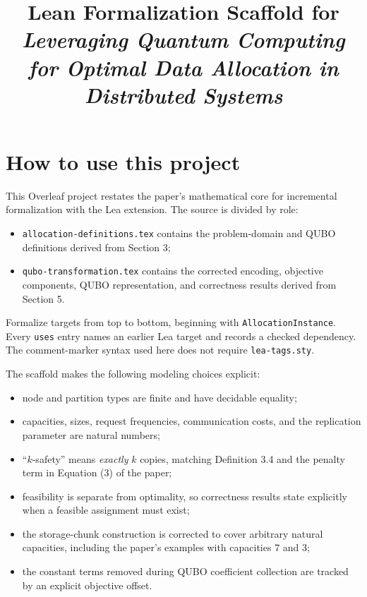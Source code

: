\documentclass[11pt]{article}
\title{Lean Formalization Scaffold for\\
  \emph{Leveraging Quantum Computing for Optimal Data Allocation in
  Distributed Systems}}
\author{}
\date{}
\begin{document}
\maketitle

\section*{How to use this project}

This Overleaf project restates the paper's mathematical core for incremental
formalization with the Lea extension. The source is divided by role:

\begin{itemize}
  \item \texttt{allocation-definitions.tex} contains the problem-domain and
    QUBO definitions derived from Section 3;
  \item \texttt{qubo-transformation.tex} contains the corrected encoding,
    objective components, QUBO representation, and correctness results derived
    from Section 5.
\end{itemize}

Formalize targets from top to bottom, beginning with
\texttt{AllocationInstance}. Every \texttt{uses} entry names an earlier Lea
target and records a checked dependency. The comment-marker syntax used here
does not require \texttt{lea-tags.sty}.

The scaffold makes the following modeling choices explicit:

\begin{itemize}
  \item node and partition types are finite and have decidable equality;
  \item capacities, sizes, request frequencies, communication costs, and the
    replication parameter are natural numbers;
  \item ``$k$-safety'' means \emph{exactly} $k$ copies, matching Definition 3.4
    and the penalty term in Equation (3) of the paper;
  \item feasibility is separate from optimality, so correctness results state
    explicitly when a feasible assignment must exist;
  \item the storage-chunk construction is corrected to cover arbitrary natural
    capacities, including the paper's examples with capacities $7$ and $3$;
  \item the constant terms removed during QUBO coefficient collection are
    tracked by an explicit objective offset.
\end{itemize}
\end{document}
